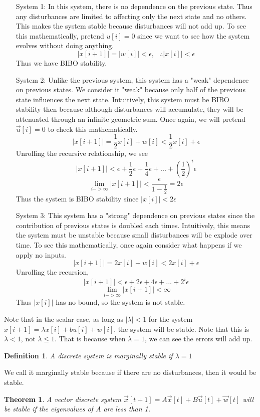 \documentclass{article}
\newtheorem{theorem}{Theorem}
\newtheorem{definition}{Definition}
\begin{document}
\begin{itemize}
    \item[System 1:] In this system, there is no dependence on the previous state.
    Thus any disturbances are limited to affecting only the next state and no others.
    This makes the system stable because disturbances will not add up.
    To see this mathematically, pretend $u[i] = 0$ since we want to see how the system evolves without doing anything.
    $$|x[i+1]|=|w[i]| < \epsilon, \>\>\> \therefore |x[i]|<\epsilon$$
    Thus we have BIBO stability.
    \item[System 2:] Unlike the previous system, this system has a "weak" dependence on previous states. We consider it "weak" because only half of the previous state influences the next state.
    Intuitively, this system must be BIBO stability then because although disturbances will accumulate, they will be attenuated through an infinite geometric sum. Once again, we will pretend $\vec{u}[i]=0$ to check this mathematically.
    $$|x[i+1]| = \frac{1}{2}x[i]+w[i] < \frac{1}{2}x[i]+ \epsilon$$
    Unrolling the recursive relationship, we see
    $$|x[i+1]| < \epsilon+\frac{1}{2}\epsilon+\frac{1}{4}\epsilon+...+\left( \frac{1}{2} \right)^i\epsilon$$
    $$\lim_{i->\infty}{|x[i+1]|}<\frac{\epsilon}{1-\frac{1}{2}} = 2\epsilon$$
    Thus the system is BIBO stability since $|x[i]| < 2\epsilon$
    \item[System 3:] This system has a "strong" dependence on previous states since the contribution of previous states is doubled each times.
    Intuitively, this means the system must be unstable because small disturbances will be explode over time. To see this mathematically, once again consider what happens if we apply no inputs.
    $$|x[i+1]| = 2x[i]+w[i] < 2x[i]+ \epsilon$$
    Unrolling the recursion,
    $$|x[i+1]| < \epsilon+2\epsilon+4\epsilon+...+2^i\epsilon$$
    $$\lim_{i->\infty}{|x[i+1]|} < \infty$$
    Thus $|x[i]|$ has no bound, so the system is not stable.
\end{itemize}
Note that in the scalar case, as long as $|\lambda| < 1$ for the system $x[i+1]=\lambda x[i]+bu[i]+w[i]$, the system will be stable. Note that this is $\lambda<1$, not $\lambda \leq 1$. That is because when $\lambda=1$, we can see the errors will add up.
\begin{definition}
    A discrete system is marginally stable if $\lambda = 1$
\end{definition}
We call it marginally stable because if there are no disturbances, then it would be stable.
\begin{theorem}
    A vector discrete system $\vec{x}[t+1]=A \vec{x}[t]+B\vec{u}[t]+\vec{w}[t]$ will be stable if the eigenvalues of $A$ are less than 1.
\end{theorem}
\end{document}
